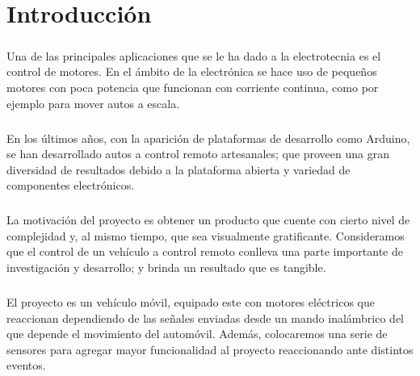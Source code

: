 

\chapter{Introducción}

\paragraph{}

Una de las principales aplicaciones que se le ha dado a la electrotecnia es el control de motores. En el ámbito de la electrónica se hace uso de pequeños motores con poca potencia que funcionan con corriente continua, como por ejemplo para mover autos a escala.

\paragraph{}

En los últimos años, con la aparición de plataformas de desarrollo como Arduino, se han desarrollado autos a control remoto artesanales; que proveen una gran diversidad de resultados debido a la plataforma abierta y variedad de componentes electrónicos.

\paragraph{}

La motivación del proyecto es obtener un producto que cuente con cierto nivel de complejidad y, al mismo tiempo, que sea visualmente gratificante. Consideramos que el control de un vehículo a control remoto conlleva una parte importante de investigación y desarrollo; y brinda un resultado que es tangible.

\paragraph{}

El proyecto es un vehículo móvil, equipado este con motores eléctricos que reaccionan dependiendo de las señales enviadas desde un mando inalámbrico del que depende el movimiento del automóvil. Además, colocaremos una serie de sensores para agregar mayor funcionalidad al proyecto reaccionando ante distintos eventos.
